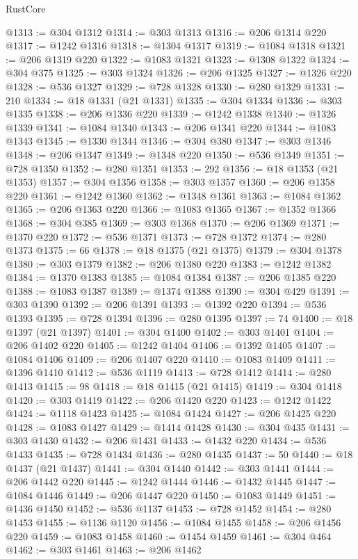 \begin{lexlean}{RustCore}
\begin{coremodule}
@1313 := @304 @1312
@1314 := @303 @1313
@1316 := @206 @1314 @220
@1317 := @1242 @1316
@1318 := @1304 @1317
@1319 := @1084 @1318
@1321 := @206 @1319 @220
@1322 := @1083 @1321
@1323 := @1308 @1322
@1324 := @304 @375
@1325 := @303 @1324
@1326 := @206 @1325
@1327 := @1326 @220
@1328 := @536 @1327
@1329 := @728 @1328
@1330 := @280 @1329
@1331 := 210
@1334 := @18 @1331 (@21 @1331)
@1335 := @304 @1334
@1336 := @303 @1335
@1338 := @206 @1336 @220
@1339 := @1242 @1338
@1340 := @1326 @1339
@1341 := @1084 @1340
@1343 := @206 @1341 @220
@1344 := @1083 @1343
@1345 := @1330 @1344
@1346 := @304 @380
@1347 := @303 @1346
@1348 := @206 @1347
@1349 := @1348 @220
@1350 := @536 @1349
@1351 := @728 @1350
@1352 := @280 @1351
@1353 := 292
@1356 := @18 @1353 (@21 @1353)
@1357 := @304 @1356
@1358 := @303 @1357
@1360 := @206 @1358 @220
@1361 := @1242 @1360
@1362 := @1348 @1361
@1363 := @1084 @1362
@1365 := @206 @1363 @220
@1366 := @1083 @1365
@1367 := @1352 @1366
@1368 := @304 @385
@1369 := @303 @1368
@1370 := @206 @1369
@1371 := @1370 @220
@1372 := @536 @1371
@1373 := @728 @1372
@1374 := @280 @1373
@1375 := 66
@1378 := @18 @1375 (@21 @1375)
@1379 := @304 @1378
@1380 := @303 @1379
@1382 := @206 @1380 @220
@1383 := @1242 @1382
@1384 := @1370 @1383
@1385 := @1084 @1384
@1387 := @206 @1385 @220
@1388 := @1083 @1387
@1389 := @1374 @1388
@1390 := @304 @429
@1391 := @303 @1390
@1392 := @206 @1391
@1393 := @1392 @220
@1394 := @536 @1393
@1395 := @728 @1394
@1396 := @280 @1395
@1397 := 74
@1400 := @18 @1397 (@21 @1397)
@1401 := @304 @1400
@1402 := @303 @1401
@1404 := @206 @1402 @220
@1405 := @1242 @1404
@1406 := @1392 @1405
@1407 := @1084 @1406
@1409 := @206 @1407 @220
@1410 := @1083 @1409
@1411 := @1396 @1410
@1412 := @536 @1119
@1413 := @728 @1412
@1414 := @280 @1413
@1415 := 98
@1418 := @18 @1415 (@21 @1415)
@1419 := @304 @1418
@1420 := @303 @1419
@1422 := @206 @1420 @220
@1423 := @1242 @1422
@1424 := @1118 @1423
@1425 := @1084 @1424
@1427 := @206 @1425 @220
@1428 := @1083 @1427
@1429 := @1414 @1428
@1430 := @304 @435
@1431 := @303 @1430
@1432 := @206 @1431
@1433 := @1432 @220
@1434 := @536 @1433
@1435 := @728 @1434
@1436 := @280 @1435
@1437 := 50
@1440 := @18 @1437 (@21 @1437)
@1441 := @304 @1440
@1442 := @303 @1441
@1444 := @206 @1442 @220
@1445 := @1242 @1444
@1446 := @1432 @1445
@1447 := @1084 @1446
@1449 := @206 @1447 @220
@1450 := @1083 @1449
@1451 := @1436 @1450
@1452 := @536 @1137
@1453 := @728 @1452
@1454 := @280 @1453
@1455 := @1136 @1120
@1456 := @1084 @1455
@1458 := @206 @1456 @220
@1459 := @1083 @1458
@1460 := @1454 @1459
@1461 := @304 @464
@1462 := @303 @1461
@1463 := @206 @1462

\end{coremodule}
\end{lexlean}
